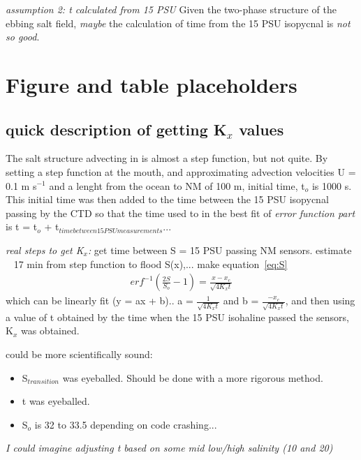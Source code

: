 \emph{assumption 2: t calculated from 15 PSU} Given the two-phase structure of the ebbing salt field, \emph{maybe} the calculation of time from the 15 PSU isopycnal is \emph{not so good}. 


\section{Figure and table placeholders}



\subsection{quick description of getting K$_x$ values}
The salt structure advecting in is almost a step function, but not quite. By setting a step function at the mouth, and approximating advection velocities U = 0.1 m s$^{-1}$ and a lenght from the ocean to NM of 100 m, initial time, t$_o$ is 1000 s. This initial time was then added to the time between the 15 PSU isopycnal passing by the CTD so that the time used to in the best fit of \emph{error function part} is t = t$_o$ + t$_{time between 15 PSU measurements}$... 

\emph{real steps to get K$_x$:} get time between S = 15 PSU passing NM sensors.  estimate ~ 17 min from step function to flood S(x),... make equation~\ref{eq:S} 
\begin{eqnarray}
erf^{-1}\left(\frac{2S}{S_o}-1\right) = \frac{x-x_c}{\sqrt{4K_xt}} \label{eq:linfitS}
\end{eqnarray}
which can be linearly fit (y = ax + b).. a = $\frac{1}{\sqrt{4K_xt}}$ and b = $\frac{-x_c}{\sqrt{4K_xt}}$, and then using a value of t obtained by the time when the 15 PSU isohaline passed the sensors, K$_x$ was obtained.  



could be more scientifically sound:
\begin{itemize}
	\item S$_{transition}$ was eyeballed. Should be done with a more rigorous method. 
	\item t was eyeballed.
	\item S$_o$ is 32 to 33.5 depending on code crashing... 
\end{itemize}

\emph{I could imagine adjusting t based on some mid low/high salinity (10 and 20)}

\renewcommand{\arraystretch}{1.3}

